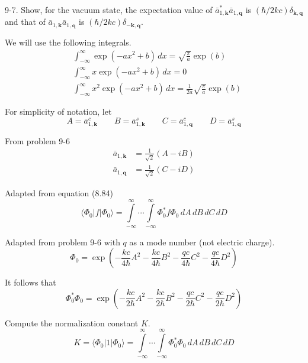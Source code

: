 \documentclass[12pt]{article}
\begin{document}
9-7.
Show, for the vacuum state, the expectation value
of $\bar a_{1,\mathbf k}^*\bar a_{1,\mathbf q}$
is $(\hbar/2kc)\delta_{\mathbf k,\mathbf q}$ and that
of $\bar a_{1,\mathbf k}\bar a_{1,\mathbf q}$
is $(\hbar/2kc)\delta_{-\mathbf k,\mathbf q}$.

\bigskip
We will use the following integrals.
\begin{align*}
&\int_{-\infty}^\infty\exp(-ax^2+b)\,dx=\sqrt{\frac{\pi}{a}}\exp(b)
\tag{1}
\\
&\int_{-\infty}^\infty x\exp(-ax^2+b)\,dx=0
\tag{2}
\\
&\int_{-\infty}^\infty x^2\exp(-ax^2+b)\,dx=\frac{1}{2a}\sqrt{\frac{\pi}{a}}\exp(b)
\tag{3}
\end{align*}

For simplicity of notation, let
\begin{equation*}
A=\bar a_{1,\mathbf k}^c
\qquad
B=\bar a_{1,\mathbf k}^s
\qquad
C=\bar a_{1,\mathbf q}^c
\qquad
D=\bar a_{1,\mathbf q}^s
\end{equation*}

From problem 9-6
\begin{equation*}
\begin{aligned}
\bar a_{1,\mathbf k}&=\frac{1}{\sqrt2}(A-iB)
\\
\bar a_{1,\mathbf q}&=\frac{1}{\sqrt2}(C-iD)
\end{aligned}
\tag{4}
\end{equation*}

Adapted from equation (8.84)
\begin{equation*}
\langle\Phi_0|f|\Phi_0\rangle
=\int\limits_{-\infty}^\infty\cdots\int\limits_{-\infty}^\infty
\Phi_0^*f\Phi_0
\,dA\,dB\,dC\,dD
\end{equation*}

Adapted from problem 9-6 with $q$ as a mode number (not electric charge).
\begin{equation*}
\Phi_0=\exp\left(
-\frac{kc}{4\hbar}A^2
-\frac{kc}{4\hbar}B^2
-\frac{qc}{4\hbar}C^2
-\frac{qc}{4\hbar}D^2
\right)
\end{equation*}

It follows that
\begin{equation*}
\Phi_0^*\Phi_0=\exp\left(
-\frac{kc}{2\hbar}A^2
-\frac{kc}{2\hbar}B^2
-\frac{qc}{2\hbar}C^2
-\frac{qc}{2\hbar}D^2
\right)
\end{equation*}

Compute the normalization constant $K$.
\begin{equation*}
K=\langle\Phi_0|1|\Phi_0\rangle
=\int\limits_{-\infty}^\infty\cdots\int\limits_{-\infty}^\infty
\Phi_0^*\Phi_0
\,dA\,dB\,dC\,dD
\end{equation*}
\end{document}
